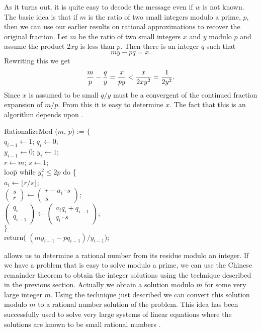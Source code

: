 As it turns out, it is quite easy to decode the message even if $w$ is
not known.  The basic idea is that if $m$ is the ratio of two small
integers modulo a prime, $p$, then we can use our earlier results on
rational approximations to recover the original fraction.
Let $m$ be the ratio of two small integers $x$ and $y$ modulo $p$ and assume
the product $2xy$ is less than $p$.  Then there is an integer $q$ such that
\[
my - pq = x.
\]
Rewriting this we get
\[
{m \over p} -  {q \over y} = {x \over p y} < {x \over 2 x y^2} = {1 \over
2 y^2}.
\]
Since $x$ is assumed to be small $q/ y$ must be a convergent of the
continued fraction expansion of $m/p$.  From this it is easy to
determine $x$.  The fact that this is an algorithm depends upon
.

\begindsacode
RationalizeMod ($m$, $p$) := $\{$ \\
\> $q_{i-1} \leftarrow 1$; $q_i \leftarrow 0$; \\
\> $y_{i-1} \leftarrow 0$; $y_i \leftarrow 1$; \\
\> $r \leftarrow m$; $s \leftarrow 1$; \\
\> loo\=p while $y_i^2 \le 2p$ do \{ \\
\>\> $a_i \leftarrow \lfloor r/s \rfloor$; \\
\>\> $\left(\!\!\begin{array}{c}s \\ r\end{array}\!\!\right) \leftarrow
   \left(\!\!\begin{array}{c} r - a_i \cdot s \\ s \end{array}\!\!\right)$; \\
\>\> $\left(\!\!\begin{array}{c}q_i \\ q_{i-1}\end{array}\!\!\right) \leftarrow
   \left(\!\!\begin{array}{c} a_i q_i + q_{i-1} \\ q_i \cdot s 
   \end{array}\!\!\right)$; \\
\>\> $\}$ \\
\> return( $(m y_{i-1} - p q_{i-1})/y_{i-1}$);
\enddsacode

 allows us to determine a rational number from
its residue modulo an integer.  If we have a problem that is easy to
solve modulo a prime, we can use the Chinese remainder theorem to
obtain the integer solutions using the technique described in the
previous section.  Actually we obtain a solution modulo $m$ for some
very large integer $m$.  Using the technique just described we can
convert this solution modulo $m$ to a rational number solution of the
problem.  This idea has been successfully used to solve very large
systems of linear equations where the solutions are known to be small
rational numbers \cite{Bender:Keener:Zippel}.

